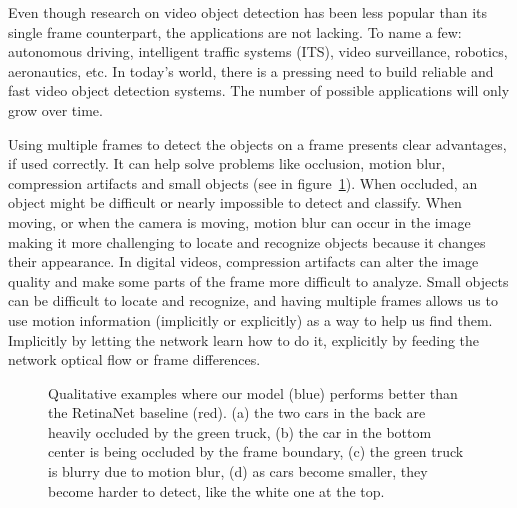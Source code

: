 \documentclass[runningheads]{llncs}
\begin{document}
Even though research on video object detection has been less popular than its single frame counterpart, the applications are not lacking. To name a few: autonomous driving, intelligent traffic systems (ITS), video surveillance, robotics, aeronautics, etc. In today's world, there is a pressing need to build reliable and fast video object detection systems. The number of possible applications will only grow over time. 

Using multiple frames to detect the objects on a frame presents clear advantages, if used correctly. It can help solve problems like occlusion, motion blur, compression artifacts and small objects (see in figure~\ref{challenges}). When occluded, an object might be difficult or nearly impossible to detect and classify. When moving, or when the camera is moving, motion blur can occur in the image making it more challenging to locate and recognize objects because it changes their appearance. In digital videos, compression artifacts can alter the image quality and make some parts of the frame more difficult to analyze. Small objects can be difficult to locate and recognize, and having multiple frames allows us to use motion information (implicitly or explicitly) as a way to help us find them. Implicitly by letting the network learn how to do it, explicitly by feeding the network optical flow or frame differences. 

\begin{figure}[t]\centering
    \hspace{2.5em}
    \hspace{2.5em}
    \hspace{2.5em}
    \vspace{-0.5em}
    \caption{Qualitative examples where our model (blue) performs better than the RetinaNet baseline (red). (a) the two cars in the back are heavily occluded by the green truck, (b) the car in the bottom center is being occluded by the frame boundary, (c) the green truck is blurry due to motion blur, (d) as cars become smaller, they become harder to detect, like the white one at the top.}
    \label{challenges}\end{figure}
\end{document}
